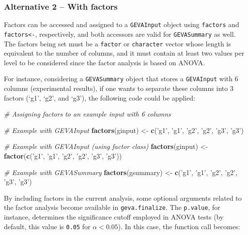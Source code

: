 \documentclass[
  12pt,
]{article}
\newenvironment{Shaded}{\begin{snugshade}}{\end{snugshade}}
\newcommand{\CommentTok}[1]{\textcolor[rgb]{0.56,0.35,0.01}{\textit{#1}}}
\newcommand{\KeywordTok}[1]{\textcolor[rgb]{0.13,0.29,0.53}{\textbf{#1}}}
\newcommand{\NormalTok}[1]{#1}
\newcommand{\StringTok}[1]{\textcolor[rgb]{0.31,0.60,0.02}{#1}}
\begin{document}
\hypertarget{alternative-2-with-factors}{%
\subsubsection{Alternative 2 -- With
factors}\label{alternative-2-with-factors}}

Factors can be accessed and assigned to a \texttt{GEVAInput} object
using \texttt{factors} and \texttt{factors\textless{}-}, respectively,
and both accessors are valid for \texttt{GEVASummary} as well. The
factors being set must be a \texttt{factor} or \texttt{character} vector
whose length is equivalent to the number of columns, and it must contain
at least two values per level to be considered since the factor analysis
is based on ANOVA.

For instance, considering a \texttt{GEVASummary} object that stores a
\texttt{GEVAInput} with 6 columns (experimental results), if one wants
to separate these columns into 3 factors (`g1', `g2', and `g3'), the
following code could be applied:

\begin{Shaded}
\begin{Highlighting}[]
\CommentTok{# Assigning factors to an example input with 6 columns}

\CommentTok{# Example with GEVAInput}
\KeywordTok{factors}\NormalTok{(ginput) <-}\StringTok{ }\KeywordTok{c}\NormalTok{(}\StringTok{'g1'}\NormalTok{, }\StringTok{'g1'}\NormalTok{, }\StringTok{'g2'}\NormalTok{, }\StringTok{'g2'}\NormalTok{, }\StringTok{'g3'}\NormalTok{, }\StringTok{'g3'}\NormalTok{)}

\CommentTok{# Example with GEVAInput (using factor class)}
\KeywordTok{factors}\NormalTok{(ginput) <-}\StringTok{ }\KeywordTok{factor}\NormalTok{(}\KeywordTok{c}\NormalTok{(}\StringTok{'g1'}\NormalTok{, }\StringTok{'g1'}\NormalTok{, }\StringTok{'g2'}\NormalTok{,}
                            \StringTok{'g2'}\NormalTok{, }\StringTok{'g3'}\NormalTok{, }\StringTok{'g3'}\NormalTok{))}

\CommentTok{# Example with GEVASummary}
\KeywordTok{factors}\NormalTok{(gsummary) <-}\StringTok{ }\KeywordTok{c}\NormalTok{(}\StringTok{'g1'}\NormalTok{, }\StringTok{'g1'}\NormalTok{, }\StringTok{'g2'}\NormalTok{, }\StringTok{'g2'}\NormalTok{, }\StringTok{'g3'}\NormalTok{, }\StringTok{'g3'}\NormalTok{)}
\end{Highlighting}
\end{Shaded}

By including factors in the current analysis, some optional arguments
related to the factor analysis become available in
\texttt{geva.finalize}. The \texttt{p.value}, for instance, determines
the significance cutoff employed in ANOVA tests (by default, this value
is \texttt{0.05} for \(\alpha < 0.05\)). In this case, the function call
becomes:
\end{document}
